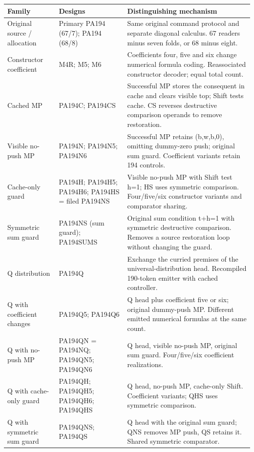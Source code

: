 \begin{longtable}{p{}p{}p{}}
\toprule Family & Designs & Distinguishing mechanism \\ \midrule\endhead
Original source / allocation & Primary PA194 (67/7); PA194 (68/8) & Same original command protocol and separate diagonal calculus. 67 readers minus seven folds, or 68 minus eight. \\
Constructor coefficient & M4R; M5; M6 & Coefficients four, five and six change numerical formula coding. Reassociated constructor decoder; equal total count. \\
Cached MP & PA194C; PA194CS & Successful MP stores the consequent in cache and clears visible top; Shift tests cache. CS reverses destructive comparison operands to remove restoration. \\
Visible no-push MP & PA194N; PA194N5; PA194N6 & Successful MP retains (b,w,b,0), omitting dummy-zero push; original sum guard. Coefficient variants retain 194 controls. \\
Cache-only guard & PA194H; PA194H5; PA194H6; PA194HS = filed PA194NS & Visible no-push MP with Shift test h=1; HS uses symmetric comparison. Four/five/six constructor variants and comparator sharing. \\
Symmetric sum guard & PA194NS (sum guard); PA194SUMS & Original sum condition t+h=1 with symmetric destructive comparison. Removes a source restoration loop without changing the guard. \\
Q distribution & PA194Q & Exchange the curried premises of the universal-distribution head. Recompiled 190-token emitter with cached controller. \\
Q with coefficient changes & PA194Q5; PA194Q6 & Q head plus coefficient five or six; original dummy-push MP. Different emitted numerical formulas at the same count. \\
Q with no-push MP & PA194QN = PA194NQ; PA194QN5; PA194QN6 & Q head, visible no-push MP, original sum guard. Four/five/six coefficient realizations. \\
Q with cache-only guard & PA194QH; PA194QH5; PA194QH6; PA194QHS & Q head, no-push MP, cache-only Shift. Coefficient variants; QHS uses symmetric comparison. \\
Q with symmetric sum guard & PA194QNS; PA194QS & Q head with the original sum guard; QNS removes MP push, QS retains it. Shared symmetric comparator. \\

\end{longtable}

